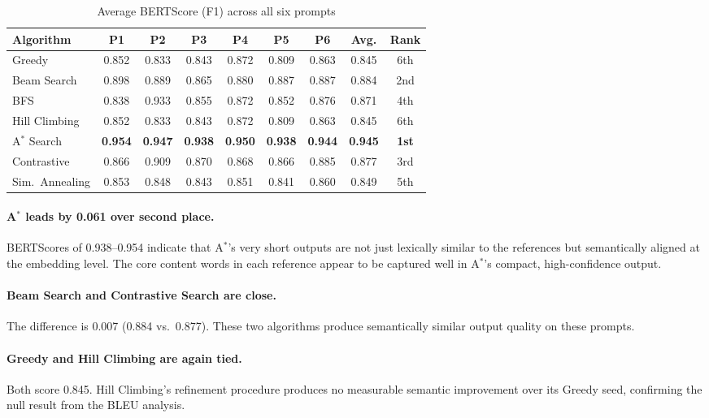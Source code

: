 \documentclass[12pt]{article}
\begin{document}
\begin{table}[H]
	\centering
	\caption{Average BERTScore (F1) across all six prompts}
	\label{tab:bert_boxed}
	\small
	\setlength{\tabcolsep}{4pt}
	\begin{tabularx}{\linewidth}{|X|c|c|c|c|c|c|c|c|}
		\hline
		\textbf{Algorithm} & \textbf{P1} & \textbf{P2} & \textbf{P3} & \textbf{P4} & \textbf{P5} & \textbf{P6} & \textbf{Avg.} & \textbf{Rank} \\ \hline
		Greedy          & 0.852 & 0.833 & 0.843 & 0.872 & 0.809 & 0.863 & 0.845 & 6th \\ \hline
		Beam Search     & 0.898 & 0.889 & 0.865 & 0.880 & 0.887 & 0.887 & 0.884 & 2nd \\ \hline
		BFS             & 0.838 & 0.933 & 0.855 & 0.872 & 0.852 & 0.876 & 0.871 & 4th \\ \hline
		Hill Climbing   & 0.852 & 0.833 & 0.843 & 0.872 & 0.809 & 0.863 & 0.845 & 6th \\ \hline
		A$^*$ Search    & \textbf{0.954} & \textbf{0.947} & \textbf{0.938} & \textbf{0.950} & \textbf{0.938} & \textbf{0.944} & \textbf{0.945} & \textbf{1st} \\ \hline
		Contrastive     & 0.866 & 0.909 & 0.870 & 0.868 & 0.866 & 0.885 & 0.877 & 3rd \\ \hline
		Sim.\ Annealing & 0.853 & 0.848 & 0.843 & 0.851 & 0.841 & 0.860 & 0.849 & 5th \\ \hline
	\end{tabularx}
\end{table}
	
	\paragraph{A$^*$ leads by 0.061 over second place.}
	BERTScores of 0.938--0.954 indicate that A$^*$'s very short outputs are not just lexically similar to the references but semantically aligned at the embedding level. The core content words in each reference appear to be captured well in A$^*$'s compact, high-confidence output.
	
	\paragraph{Beam Search and Contrastive Search are close.}
	The difference is 0.007 (0.884 vs.\ 0.877). These two algorithms produce semantically similar output quality on these prompts.
	
	\paragraph{Greedy and Hill Climbing are again tied.}
	Both score 0.845. Hill Climbing's refinement procedure produces no measurable semantic improvement over its Greedy seed, confirming the null result from the BLEU analysis.
	
\end{document}
